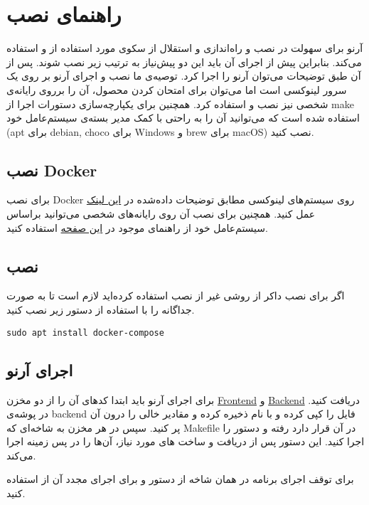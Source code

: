 \chapter{راهنمای نصب}

آرنو برای سهولت در نصب و راه‌اندازی و استقلال از سکوی مورد استفاده از  و  استفاده می‌کند.
بنابراین پیش از اجرای آن باید این دو پیش‌نیاز به ترتیب زیر نصب شوند. پس از آن طبق توضیحات می‌توان آرنو را اجرا کرد.
توصیه‌ی ما نصب و اجرای آرنو بر روی یک سرور لینوکسی است اما می‌توان برای امتحان کردن محصول، آن را برروی رایانه‌ی شخصی نیز نصب و استفاده کرد.
همچنین برای یکپارچه‌سازی دستورات اجرا از make استفاده شده است که می‌توانید آن را به راحتی با کمک مدیر بسته‌ی سیستم‌عامل خود (apt برای debian, choco برای Windows و brew برای macOS) نصب کنید.

\section{نصب Docker}

برای نصب Docker روی سیستم‌های لینوکسی مطابق توضیحات داده‌شده در \href{https://docs.docker.com/compose/install/compose-plugin/#install-using-the-repository}{این لینک} عمل کنید. 
همچنین برای نصب آن روی رایانه‌های شخصی می‌توانید براساس سیستم‌عامل خود از راهنمای موجود در \href{https://docs.docker.com/get-docker/}{این صفحه} استفاده کنید.

\section{نصب }

اگر برای نصب داکر از روشی غیر از نصب  استفاده کرده‌اید لازم است تا به صورت جداگانه  را با استفاده از دستور زیر نصب کنید.
\lstset{language=Bash}
\lstset{frame=lines}
\begin{latin}
\begin{lstlisting}
sudo apt install docker-compose
\end{lstlisting}
\end{latin}

\section{اجرای آرنو}

برای اجرای آرنو باید ابتدا کدهای آن را از دو مخزن
\href{https://github.com/Arno-Project/Frontend}{Frontend} و
\href{https://github.com/Arno-Project/Backend}{Backend}
دریافت کنید.
در پوشه‌ی backend فایل  را کپی کرده و با نام  ذخیره کرده و مقادیر خالی را درون آن پر کنید.
سپس در هر مخزن به شاخه‌ای که Makefile در آن قرار دارد رفته و دستور  را اجرا کنید.
این دستور پس از دریافت و ساخت  های مورد نیاز، آن‌ها را در پس زمینه اجرا می‌کند.

برای توقف اجرای برنامه در همان شاخه از دستور  و برای اجرای مجدد آن از  استفاده کنید.
